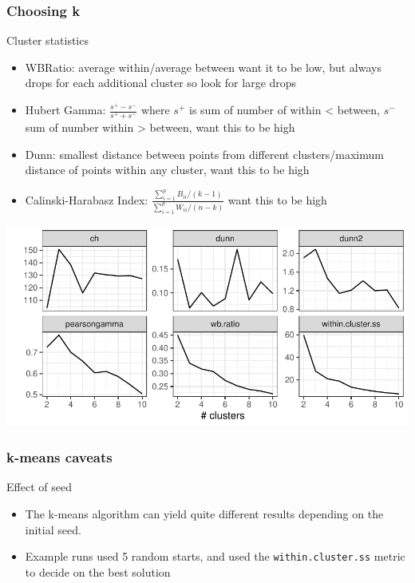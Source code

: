 \documentclass[a4paper]{article}
\begin{document}
\subsubsection{Choosing k}
Cluster statistics
\begin{itemize}
	\item WBRatio: average within/average between want it to be low, but always drops for each additional cluster so look for large drops
	\item Hubert Gamma: \( \frac{s^+ - s^-}{s^+ + s^-} \)  where \( s^+ \) is  sum of number of within < between, \( s^- \) sum of number within > between, want this to be high
	\item Dunn: smallest distance between points from different clusters/maximum distance of points within any cluster, want this to be high
	\item Calinski-Harabasz Index: \(\frac{\sum_{i=1}^p B_{ii}/(k-1)}{\sum_{i=1}^p W_{ii}/(n-k)} \) want this to be high
\end{itemize}
\begin{Schunk}


{\centering \includegraphics[width=\maxwidth]{figure/listings-unnamed-chunk-476-1} 

}

\end{Schunk}
\subsubsection{k-means caveats}
Effect of seed
\begin{itemize}
	\item The k-means algorithm can yield quite different results depending on the initial seed.
	\item Example runs used 5 random starts, and used the \lstinline|within.cluster.ss| metric to decide on the best solution
\end{itemize}
\end{document}
